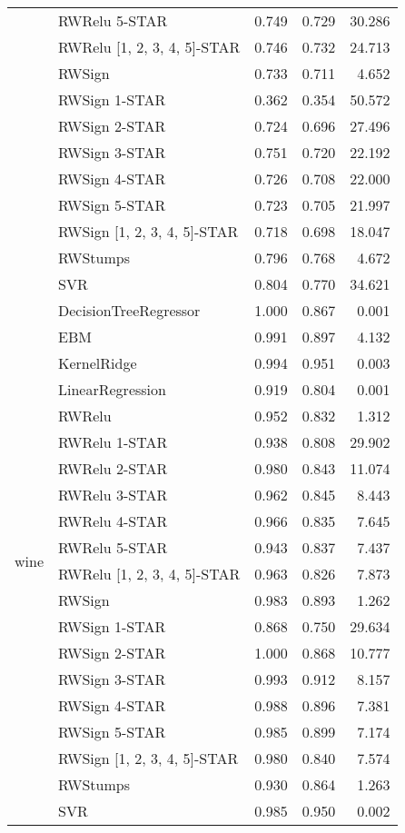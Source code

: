 \begin{tabular}{llrrr}
 & RWRelu 5-STAR & 0.749 & 0.729 & 30.286 \\
 & RWRelu [1, 2, 3, 4, 5]-STAR & 0.746 & 0.732 & 24.713 \\
 & RWSign & 0.733 & 0.711 & 4.652 \\
 & RWSign 1-STAR & 0.362 & 0.354 & 50.572 \\
 & RWSign 2-STAR & 0.724 & 0.696 & 27.496 \\
 & RWSign 3-STAR & 0.751 & 0.720 & 22.192 \\
 & RWSign 4-STAR & 0.726 & 0.708 & 22.000 \\
 & RWSign 5-STAR & 0.723 & 0.705 & 21.997 \\
 & RWSign [1, 2, 3, 4, 5]-STAR & 0.718 & 0.698 & 18.047 \\
 & RWStumps & 0.796 & 0.768 & 4.672 \\
 & SVR & 0.804 & 0.770 & 34.621 \\
\cline{1-5}
\multirow[t]{20}{*}{wine} & DecisionTreeRegressor & 1.000 & 0.867 & 0.001 \\
 & EBM & 0.991 & 0.897 & 4.132 \\
 & KernelRidge & 0.994 & 0.951 & 0.003 \\
 & LinearRegression & 0.919 & 0.804 & 0.001 \\
 & RWRelu & 0.952 & 0.832 & 1.312 \\
 & RWRelu 1-STAR & 0.938 & 0.808 & 29.902 \\
 & RWRelu 2-STAR & 0.980 & 0.843 & 11.074 \\
 & RWRelu 3-STAR & 0.962 & 0.845 & 8.443 \\
 & RWRelu 4-STAR & 0.966 & 0.835 & 7.645 \\
 & RWRelu 5-STAR & 0.943 & 0.837 & 7.437 \\
 & RWRelu [1, 2, 3, 4, 5]-STAR & 0.963 & 0.826 & 7.873 \\
 & RWSign & 0.983 & 0.893 & 1.262 \\
 & RWSign 1-STAR & 0.868 & 0.750 & 29.634 \\
 & RWSign 2-STAR & 1.000 & 0.868 & 10.777 \\
 & RWSign 3-STAR & 0.993 & 0.912 & 8.157 \\
 & RWSign 4-STAR & 0.988 & 0.896 & 7.381 \\
 & RWSign 5-STAR & 0.985 & 0.899 & 7.174 \\
 & RWSign [1, 2, 3, 4, 5]-STAR & 0.980 & 0.840 & 7.574 \\
 & RWStumps & 0.930 & 0.864 & 1.263 \\
 & SVR & 0.985 & 0.950 & 0.002 \\
\cline{1-5}
\bottomrule
\end{tabular}
